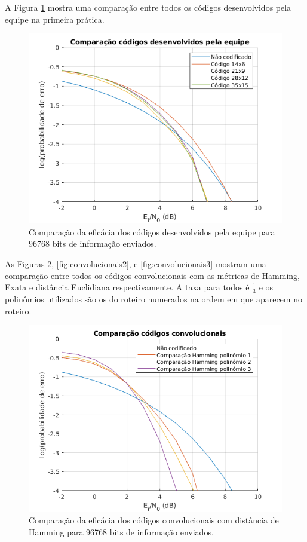 \newpage
A Figura \ref{fig:proprios} mostra uma comparação entre todos os códigos desenvolvidos pela equipe na primeira prática.

\begin{figure}[ht]
	\centering
	\captionsetup{justification=centering}
	\includegraphics[width=\linewidth]{floats/proprios.png}
	\caption{\label{fig:proprios}Comparação da eficácia dos códigos desenvolvidos pela equipe para 96768 bits de informação enviados.}
\end{figure}

\newpage
As Figuras \ref{fig:convolucionais1}, \ref{fig:convolucionais2}, e \ref{fig:convolucionais3} mostram uma comparação entre todos os códigos convolucionais com as métricas de Hamming, Exata e distância Euclidiana respectivamente. A taxa para todos é $\frac{1}{3}$ e os polinômios utilizados são os do roteiro numerados na ordem em que aparecem no roteiro.

\begin{figure}[ht]
	\centering
	\captionsetup{justification=centering}
	\includegraphics[width=\linewidth]{floats/conv1.png}
	\caption{\label{fig:convolucionais1}Comparação da eficácia dos códigos convolucionais com distância de Hamming para 96768 bits de informação enviados.}
\end{figure}

